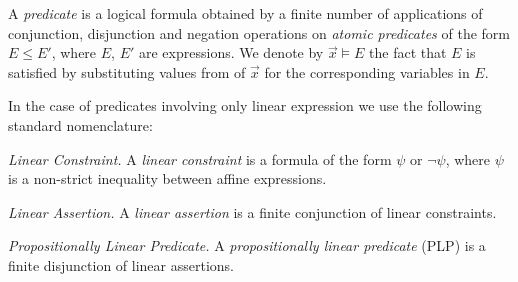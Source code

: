 \smallskip{}
A \emph{predicate} is a logical formula obtained by a finite number of 
applications of conjunction, disjunction and negation operations on 
\emph{atomic predicates} of the form $E\leq E'$, where $E$, $E'$ are 
expressions. We denote by $\vec{x}\models E$ the fact that $E$ is satisfied by 
substituting values from of $\vec{x}$ for the corresponding variables in $E$.

\smallskip{}
In the case of predicates involving only linear expression we use the following 
standard nomenclature:
\begin{compactitem}
	\item {\em Linear Constraint.} A \emph{linear constraint} is a formula of the
	form $\psi$ or $\neg\psi$, where  $\psi$ is a non-strict inequality
	between affine expressions.
	\item {\em Linear Assertion.} A \emph{linear assertion} is a finite conjunction
	of linear constraints.
	\item {\em Propositionally Linear Predicate.}
	A  \emph{propositionally linear predicate} (PLP) is a finite disjunction of
	linear assertions.
\end{compactitem}



